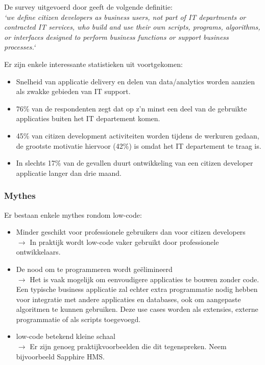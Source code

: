 De survey uitgevoerd door \textcite{McKendrick2017} geeft de volgende definitie:\\
\textit{`we define citizen developers as business users, not part of IT departments or contracted IT services, who build and use their own scripts, programs, algorithms, or interfaces designed to perform business functions or support business processes.`}

Er zijn enkele interessante statistieken uit voortgekomen:
\begin{itemize}
    \item Snelheid van applicatie delivery en delen van data/analytics worden aanzien als zwakke gebieden van IT support.
    \item 76\% van de respondenten zegt dat op z'n minst een deel van de gebruikte applicaties buiten het IT departement komen.
    \item 45\% van citizen development activiteiten worden tijdens de werkuren gedaan, de grootste motivatie hiervoor (42\%) is omdat het IT departement te traag is.
    \item In slechts 17\% van de gevallen duurt ontwikkeling van een citizen developer applicatie langer dan drie maand.
\end{itemize}

\subsubsection{Mythes}

Er bestaan enkele mythes rondom low-code:
\begin{itemize}
    \item Minder geschikt voor professionele gebruikers dan voor citizen developers \\
    $\rightarrow$ In praktijk wordt low-code vaker gebruikt door professionele ontwikkelaars.
    \item De nood om te programmeren wordt geëlimineerd \\
    $\rightarrow$ Het is vaak mogelijk om eenvoudigere applicaties te bouwen zonder code. Een typische business applicatie zal echter extra programmatie nodig hebben voor integratie met andere applicaties en databases, ook om aangepaste algoritmen te kunnen gebruiken. Deze use cases worden als extensies, externe programmatie of als scripts toegevoegd.
    \item low-code betekend kleine schaal \\
    $\rightarrow$ Er zijn genoeg praktijkvoorbeelden die dit tegenspreken. Neem bijvoorbeeld Sapphire HMS. \autocite{Bashar2017}
\end{itemize} \autocite{Richardson2016}

